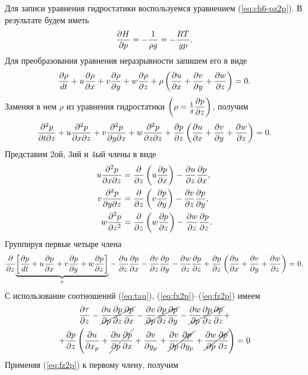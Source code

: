     Для записи уравнения гидростатики воспользуемся уравнением (\ref{eq:ch6-pz2p}). В результате будем иметь
    \begin{equation}
        \label{ch6:DwDt2p}
        \pd{H}{p}=-\frac{1}{\rho g}=-\frac{RT}{gp}.
    \end{equation}
    Для преобразования уравнения неразрывности запишем его в виде
    \begin{equation*}
        \fd{\rho} + \rho \left( \pd{u}{x} + \pd{v}{y} + \pd{w}{z} \right) = 0.
    \end{equation*}
    Заменяя в нем $\rho$ из уравнения гидростатики $\left( \rho=\frac{1}{g}\pd{p}{z} \right)$, получим
    \begin{equation*}
        \frac{\partial^2 p}{\partial t \partial z} +
        u\frac{\partial^2 p}{\partial x \partial z} +
        v\frac{\partial^2 p}{\partial y \partial z} +
        w\frac{\partial^2 p}{\partial z \partial z} +
        \pd{p}{z} \left( \pd{u}{x} + \pd{v}{y} + \pd{w}{z} \right) = 0.
    \end{equation*}
    Представим 2ой, 3ий и 4ый члены в виде
    \begin{align*}
        u\frac{\partial^2 p}{\partial x \partial z} &= \pd{}{z} \left( u\pd{p}{x} \right) - \pd{u}{z}\pd{p}{x}, \\
        v\frac{\partial^2 p}{\partial y \partial z} &= \pd{}{z} \left( v\pd{p}{y} \right) - \pd{v}{z}\pd{p}{y}, \\
        w\frac{\partial^2 p}{\partial z^2} &= \pd{}{z} \left( w\pd{p}{z} \right) - \pd{w}{z}\pd{p}{z}.
    \end{align*}
    Группируя первые четыре члена
    \begin{align*}
        \pd{}{z} {\underbrace{\left[ \fd{p} \right]}_{\tau}} - \pd{u}{z}\pd{p}{x}-\pd{v}{z}\pd{p}{y}-\pd{w}{z}\pd{p}{z}+\pd{p}{z} \left( \pd{u}{x} + \pd{v}{y} + \pd{w}{z} \right) = 0.
    \end{align*}
   С использование соотношений (\ref{eq:tau}), (\ref{eq:fx2p})--(\ref{eq:fz2p}) имеем
   \begin{multline*}
       \pd{\tau}{z}-
       \cancel{\pd{u}{p}\pd{p}{z}\pd{p}{x}}-
       \cancel{\pd{v}{p}\pd{p}{z}\pd{p}{y}}-
       \cancel{\pd{w}{p}\pd{p}{z}\pd{p}{z}}+ \\
     + \pd{p}{z} \left( \pd{u}{x_p} + \cancel{\pd{u}{p}\pd{p}{x}} + 
     \pd{v}{y_p} + \cancel{\pd{v}{p}\pd{p}{y_p}}+\cancel{\pd{w}{p}\pd{p}{z}} \right) = 0
   \end{multline*}
   Применяя (\ref{eq:fz2p}) к первому члену, получим
